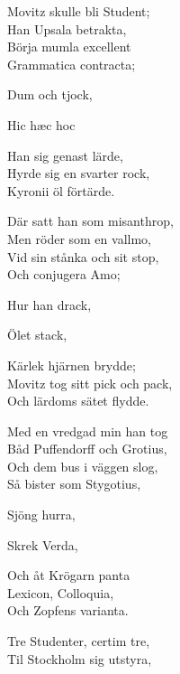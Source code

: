 \vspace{10pt}
Movitz skulle bli Student;\\
Han Upsala betrakta,\\
Börja mumla excellent\\
Grammatica contracta;\par
\hspace{20pt}Dum och tjock,\par
\hspace{20pt}Hic hæc hoc\par
\hspace{20pt}Han sig genast lärde,\\
Hyrde sig en svarter rock,\\
Kyronii öl förtärde.\par
\vspace{10pt}
Där satt han som misanthrop,\\
Men röder som en vallmo,\\
Vid sin stånka och sit stop,\\
Och conjugera Amo;\par
\hspace{20pt}Hur han drack,\par
\hspace{20pt}Ölet stack,\par
\hspace{20pt}Kärlek hjärnen brydde;\\
Movitz tog sitt pick och pack,\\
Och lärdoms sätet flydde.\par
\vspace{10pt}
Med en vredgad min han tog\\
Båd Puffendorff och Grotius,\\
Och dem bus i väggen slog,\\
Så bister som Stygotius,\par
\hspace{20pt}Sjöng hurra,\par
\hspace{20pt}Skrek Verda,\par
\hspace{20pt}Och åt Krögarn panta\\
Lexicon, Colloquia,\\
Och Zopfens varianta.\par
\vspace{10pt}
Tre Studenter, certim tre,\\
Til Stockholm sig utstyra,\\
